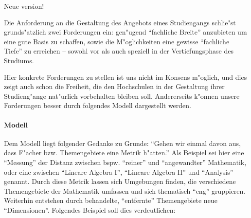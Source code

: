 \begin{kcmt6XX}

Neue version!

Die Anforderung an die Gestaltung des Angebots eines Studiengangs schlie"st
grunds"atzlich zwei Forderungen ein: gen"ugend "`fachliche Breite"' anzubieten
um eine gute Basis zu schaffen, sowie die M"oglichkeiten eine gewisse
"`fachliche Tiefe"' zu erreichen -- sowohl vor als auch speziell in der Vertiefungsphase
des Studiums.

Hier konkrete Forderungen zu stellen ist uns nicht im Konsens m"oglich, und dies
zeigt auch schon die Freiheit, die den Hochschulen in der Gestaltung ihrer Studieng"ange
nat"urlich vorbehalten bleiben soll. Andererseits k"onnen unsere Forderungen besser
durch folgendes Modell dargestellt werden.

\paragraph{Modell} Dem Modell liegt folgender Gedanke zu Grunde: "`Gehen wir einmal davon
aus, dass F"acher bzw. Themengebiete eine Metrik h"atten."' Als Beispiel sei hier eine
"`Messung"' der Distanz zwischen bspw. "`reiner"' und "`angewandter"' Mathematik, oder
eine zwischen "`Lineare Algebra I"', "`Lineare Algebra II"' und "`Analysis"' genannt. Durch diese Metrik
lassen sich Umgebungen finden, die verschiedene Themengebiete der Mathematik umfassen
und sich thematisch "`eng"' gruppieren. Weiterhin entstehen durch behandelte, "`entfernte"'
Themengebiete neue "`Dimensionen"'. Folgendes Beispiel soll dies verdeutlichen:

\begin{center}
\end{center}


\end{kcmt6XX}
